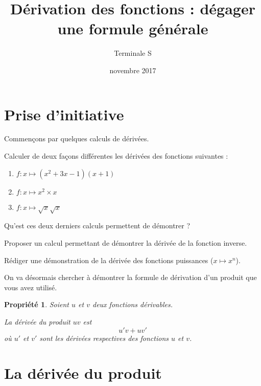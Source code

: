 \documentclass[12pt,a4paper,french]{article}
\title{Dérivation des fonctions : dégager une formule générale}
\author{Terminale S}
\date{novembre 2017}
\makeatletter
\renewcommand{\maketitle}%
{\framebox{%
    \begin{minipage}{1.0\linewidth}%
      \begin{center}%
        \Large \@title ~-- \@author \\%
        \@date%
      \end{center}%
    \end{minipage}}%
  \normalsize%
}
\theoremstyle{break}
\newtheorem{propriete}{Propriété}
\theoremstyle{plain}
\theoremstyle{nonumberplain}
\theoremstyle{nonumberbreak}
\makeatother
\begin{document}
\maketitle

\section{Prise d'initiative}

Commençons par quelques calculs de dérivées.

\begin{question}
  Calculer de deux façons différentes les dérivées des fonctions
  suivantes :
  \begin{enumerate}
    \item $f:x\mapsto (x^2 + 3x -1)(x + 1)$
    \item $f:x\mapsto x^2\times x$
    \item $f:x\mapsto \sqrt{x}\sqrt{x}$
  \end{enumerate}
\end{question}

Qu'est ces deux derniers calculs permettent de démontrer ?

Proposer un calcul permettant de démontrer la dérivée de la fonction
inverse.

Rédiger une démonstration de la dérivée des fonctions puissances
($x\mapsto x^n$).

On va désormais chercher à démontrer la formule de dérivation d'un
produit que vous avez utilisé.

\begin{propriete}
  Soient $u$ et $v$ deux fonctions dérivables.

  La dérivée du produit $uv$ est \[u'v + uv'\] où $u'$ et $v'$ sont les
  dérivées respectives des fonctions $u$ et $v$.
\end{propriete}

%

\pagebreak
\section{La dérivée du produit}
\end{document}
